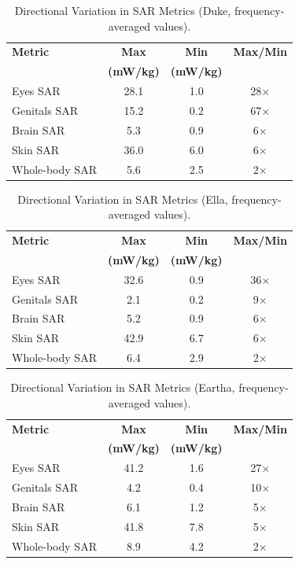 \documentclass{iopjournal}
\begin{document}
\begin{table}[!h]
\centering
\caption{Directional Variation in SAR Metrics (Duke, frequency-averaged values).}
\label{table:direction_var_duke}
\begin{tabular}{@{}lccc@{}}
\toprule
\textbf{Metric} & \textbf{Max} & \textbf{Min} & \textbf{Max/Min} \\
 & \textbf{(mW/kg)} & \textbf{(mW/kg)} & \\
\midrule
Eyes SAR & 28.1 & 1.0 & 28$\times$ \\
Genitals SAR & 15.2 & 0.2 & 67$\times$ \\
Brain SAR & 5.3 & 0.9 & 6$\times$ \\
Skin SAR & 36.0 & 6.0 & 6$\times$ \\
Whole-body SAR & 5.6 & 2.5 & 2$\times$ \\
\bottomrule
\end{tabular}
\end{table}

\begin{table}[!h]
\centering
\caption{Directional Variation in SAR Metrics (Ella, frequency-averaged values).}
\label{table:direction_var_ella}
\begin{tabular}{@{}lccc@{}}
\toprule
\textbf{Metric} & \textbf{Max} & \textbf{Min} & \textbf{Max/Min} \\
 & \textbf{(mW/kg)} & \textbf{(mW/kg)} & \\
\midrule
Eyes SAR & 32.6 & 0.9 & 36$\times$ \\
Genitals SAR & 2.1 & 0.2 & 9$\times$ \\
Brain SAR & 5.2 & 0.9 & 6$\times$ \\
Skin SAR & 42.9 & 6.7 & 6$\times$ \\
Whole-body SAR & 6.4 & 2.9 & 2$\times$ \\
\bottomrule
\end{tabular}
\end{table}

\begin{table}[!h]
\centering
\caption{Directional Variation in SAR Metrics (Eartha, frequency-averaged values).}
\label{table:direction_var_eartha}
\begin{tabular}{@{}lccc@{}}
\toprule
\textbf{Metric} & \textbf{Max} & \textbf{Min} & \textbf{Max/Min} \\
 & \textbf{(mW/kg)} & \textbf{(mW/kg)} & \\
\midrule
Eyes SAR & 41.2 & 1.6 & 27$\times$ \\
Genitals SAR & 4.2 & 0.4 & 10$\times$ \\
Brain SAR & 6.1 & 1.2 & 5$\times$ \\
Skin SAR & 41.8 & 7.8 & 5$\times$ \\
Whole-body SAR & 8.9 & 4.2 & 2$\times$ \\
\bottomrule
\end{tabular}
\end{table}
\end{document}
